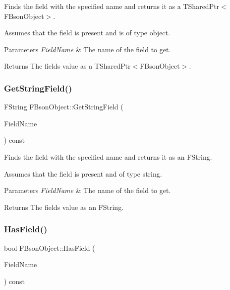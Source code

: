 Finds the field with the specified name and returns it as a T\+Shared\+Ptr$<$\+F\+Bson\+Object$>$.

Assumes that the field is present and is of type object.


\begin{DoxyParams}{Parameters}
{\em Field\+Name} & The name of the field to get. \\
\hline
\end{DoxyParams}
\begin{DoxyReturn}{Returns}
The field\textquotesingle{}s value as a T\+Shared\+Ptr$<$\+F\+Bson\+Object$>$. 
\end{DoxyReturn}
\mbox{\label{class_f_bson_object_a2fabcf26e54c75aa16dc75e0ce9fc37c}} 
\subsubsection{\texorpdfstring{Get\+String\+Field()}{GetStringField()}}
{\footnotesize\ttfamily F\+String F\+Bson\+Object\+::\+Get\+String\+Field (\begin{DoxyParamCaption}\item[{const F\+String \&}]{Field\+Name }\end{DoxyParamCaption}) const}

Finds the field with the specified name and returns it as an F\+String.

Assumes that the field is present and of type string.


\begin{DoxyParams}{Parameters}
{\em Field\+Name} & The name of the field to get. \\
\hline
\end{DoxyParams}
\begin{DoxyReturn}{Returns}
The field\textquotesingle{}s value as an F\+String. 
\end{DoxyReturn}
\mbox{\label{class_f_bson_object_a9d47685e9b2f59df92ccfe1351a49e68}} 
\subsubsection{\texorpdfstring{Has\+Field()}{HasField()}}
{\footnotesize\ttfamily bool F\+Bson\+Object\+::\+Has\+Field (\begin{DoxyParamCaption}\item[{const F\+String \&}]{Field\+Name }\end{DoxyParamCaption}) const}

